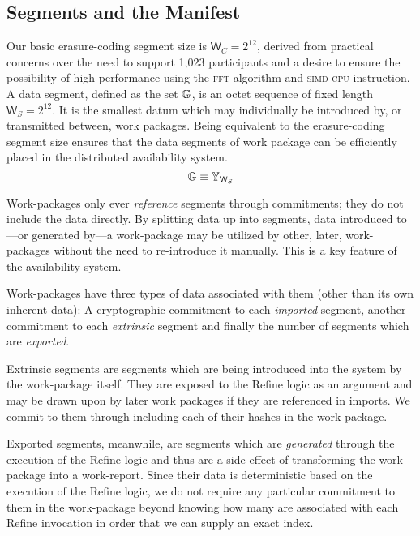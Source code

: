 \subsection{Segments and the Manifest}

Our basic erasure-coding segment size is $\mathsf{W}_C = 2^{12}$, derived from practical concerns over the need to support 1,023 participants and a desire to ensure the possibility of high performance using the \textsc{fft} algorithm and \textsc{simd} \textsc{cpu} instruction. A data segment, defined as the set $\mathbb{G}$, is an octet sequence of fixed length $\mathsf{W}_S = 2^{12}$. It is the smallest datum which may individually be introduced by, or transmitted between, work packages. Being equivalent to the erasure-coding segment size ensures that the data segments of work package can be efficiently placed in the distributed availability system.
\begin{equation}\label{eq:segment}
  \mathbb{G} \equiv \mathbb{Y}_{\mathsf{W}_S}
\end{equation}

Work-packages only ever \emph{reference} segments through commitments; they do not include the data directly. By splitting data up into segments, data introduced to---or generated by---a work-package may be utilized by other, later, work-packages without the need to re-introduce it manually. This is a key feature of the \Jam availability system.

Work-packages have three types of data associated with them (other than its own inherent data): A cryptographic commitment to each \emph{imported} segment, another commitment to each \emph{extrinsic} segment and finally the number of segments which are \emph{exported}.

Extrinsic segments are segments which are being introduced into the system by the work-package itself. They are exposed to the Refine logic as an argument and may be drawn upon by later work packages if they are referenced in imports. We commit to them through including each of their hashes in the work-package.

Exported segments, meanwhile, are segments which are \emph{generated} through the execution of the Refine logic and thus are a side effect of transforming the work-package into a work-report. Since their data is deterministic based on the execution of the Refine logic, we do not require any particular commitment to them in the work-package beyond knowing how many are associated with each Refine invocation in order that we can supply an exact index.

